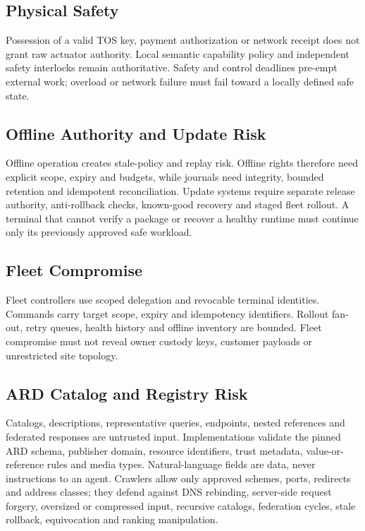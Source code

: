 \documentclass[11pt,oneside]{article}
\begin{document}
\subsection{Physical Safety}

Possession of a valid TOS key, payment authorization or network receipt does not grant raw
actuator authority. Local semantic capability policy and independent safety interlocks remain
authoritative. Safety and control deadlines pre-empt external work; overload or network
failure must fail toward a locally defined safe state.

\subsection{Offline Authority and Update Risk}

Offline operation creates stale-policy and replay risk. Offline rights therefore need explicit
scope, expiry and budgets, while journals need integrity, bounded retention and idempotent
reconciliation. Update systems require separate release authority, anti-rollback checks,
known-good recovery and staged fleet rollout. A terminal that cannot verify a package or
recover a healthy runtime must continue only its previously approved safe workload.

\subsection{Fleet Compromise}

Fleet controllers use scoped delegation and revocable terminal identities. Commands carry
target scope, expiry and idempotency identifiers. Rollout fan-out, retry queues, health
history and offline inventory are bounded. Fleet compromise must not reveal owner custody
keys, customer payloads or unrestricted site topology.

\subsection{ARD Catalog and Registry Risk}

Catalogs, descriptions, representative queries, endpoints, nested references and federated
responses are untrusted input. Implementations validate the pinned ARD schema, publisher
domain, resource identifiers, trust metadata, value-or-reference rules and media types.
Natural-language fields are data, never instructions to an agent. Crawlers allow only
approved schemes, ports, redirects and address classes; they defend against DNS rebinding,
server-side request forgery, oversized or compressed input, recursive catalogs, federation
cycles, stale rollback, equivocation and ranking manipulation.
\end{document}
